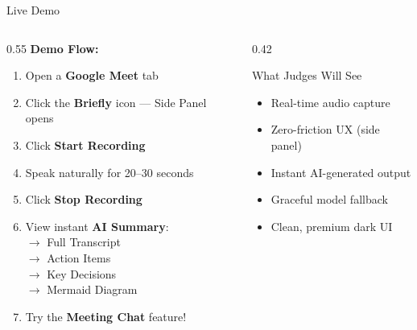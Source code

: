 \documentclass[aspectratio=169]{beamer}
\newcommand{\hl}[1]{\textcolor{accentlight}{\textbf{#1}}}
\newcommand{\ok}[1]{\textcolor{successgreen}{\textbf{#1}}}
\begin{document}
\begin{frame}{Live Demo}
  \begin{columns}[T]
    \begin{column}{0.55\textwidth}
      \textbf{\textcolor{accentlight}{Demo Flow:}}
      \vspace{0.3cm}
      \begin{enumerate}
        \item Open a \hl{Google Meet} tab
        \item Click the \hl{Briefly} icon --- Side Panel opens
        \item Click \ok{Start Recording}
        \item Speak naturally for 20--30 seconds
        \item Click \ok{Stop Recording}
        \item View instant \hl{AI Summary}:\\[0.15cm]
              \quad $\to$ Full Transcript\\
              \quad $\to$ Action Items\\
              \quad $\to$ Key Decisions\\
              \quad $\to$ Mermaid Diagram
        \item Try the \hl{Meeting Chat} feature!
      \end{enumerate}
    \end{column}
    \begin{column}{0.42\textwidth}
      \begin{block}{What Judges Will See}
        \begin{itemize}
          \item Real-time audio capture
          \item Zero-friction UX (side panel)
          \item Instant AI-generated output
          \item Graceful model fallback
          \item Clean, premium dark UI
        \end{itemize}
      \end{block}
    \end{column}
  \end{columns}
\end{frame}
\end{document}
